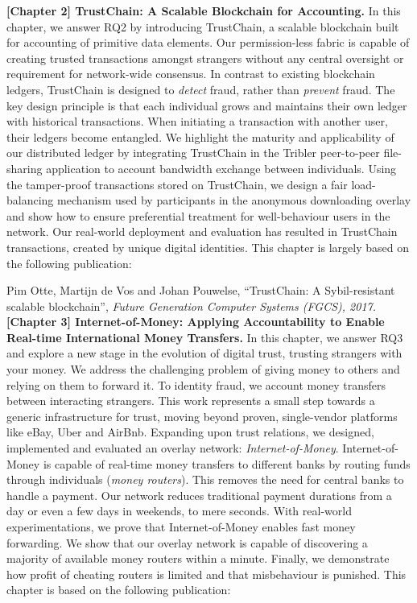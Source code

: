\textbf{[Chapter 2] TrustChain: A Scalable Blockchain for Accounting.}
In this chapter, we answer RQ2 by introducing TrustChain, a scalable blockchain built for accounting of primitive data elements.
Our permission-less fabric is capable of creating trusted transactions amongst strangers without any central oversight or requirement for network-wide consensus.
In contrast to existing blockchain ledgers, TrustChain is designed to \emph{detect} fraud, rather than \emph{prevent} fraud.
The key design principle is that each individual grows and maintains their own ledger with historical transactions.
When initiating a transaction with another user, their ledgers become entangled.
We highlight the maturity and applicability of our distributed ledger by integrating TrustChain in the Tribler peer-to-peer file-sharing application to account bandwidth exchange between individuals.
Using the tamper-proof transactions stored on TrustChain, we design a fair load-balancing mechanism used by participants in the anonymous downloading overlay and show how to ensure preferential treatment for well-behaviour users in the network. %
Our real-world deployment and evaluation has resulted in  TrustChain transactions, created by  unique digital identities.
This chapter is largely based on the following publication:

Pim Otte, Martijn de Vos and Johan Pouwelse, \enquote{TrustChain: A Sybil-resistant scalable blockchain}, \emph{Future Generation Computer Systems (FGCS), 2017.}\\

\textbf{[Chapter 3] Internet-of-Money: Applying Accountability to Enable Real-time International Money Transfers.}
In this chapter, we answer RQ3 and explore a new stage in the evolution of digital trust, trusting strangers with your money.
We address the challenging problem of giving money to others and relying on them to forward it.
To identity fraud, we account money transfers between interacting strangers.
This work represents a small step towards a generic infrastructure for trust, moving beyond proven, single-vendor platforms like eBay, Uber and AirBnb.
Expanding upon trust relations, we designed, implemented and evaluated an overlay network: \emph{Internet-of-Money}.
Internet-of-Money is capable of real-time money transfers to different banks by routing funds through individuals (\emph{money routers}).
This removes the need for central banks to handle a payment.
Our network reduces traditional payment durations from a day or even a few days in weekends, to mere seconds.
With real-world experimentations, we prove that Internet-of-Money enables fast money forwarding.
We show that our overlay network is capable of discovering a majority of available money routers within a minute.
Finally, we demonstrate how profit of cheating routers is limited and that misbehaviour is punished.
This chapter is based on the following publication:

